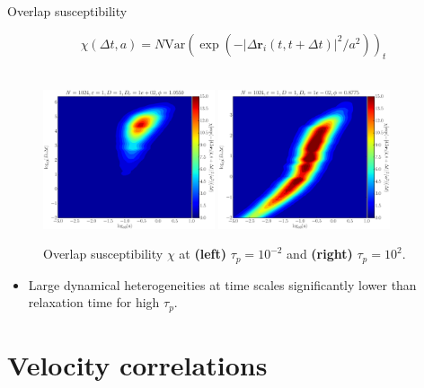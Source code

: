 \documentclass{beamer}
\begin{document}
\begin{frame}{Overlap susceptibility}

\begin{equation}
\chi(\Delta t, a) = N \mathrm{Var}\left(\exp\left(-|\Delta \boldsymbol{r}_i(t, t + \Delta t)|^2/a^2\right)\right)_t
\end{equation}
\mbox{}\\

\begin{figure}
\centering
\includegraphics[width=0.45\textwidth]{No1024_Fl1000_Vl0000_Tl1000_Rn1000_Dl1055_El0000.datN.overlap.eps}
\includegraphics[width=0.45\textwidth]{No1024_Fl1000_Vl0000_Tl1000_Rj1000_Dk8775_El0000.datN.overlap.eps}
\caption{Overlap susceptibility $\chi$ at {\bf (left)} $\tau_p = 10^{-2}$ and {\bf (right)} $\tau_p = 10^2$.}
\end{figure}

\begin{itemize}
  \item Large dynamical heterogeneities at time scales significantly lower than relaxation time for high $\tau_p$.
\end{itemize}

\end{frame}

\section{Velocity correlations}
\end{document}
